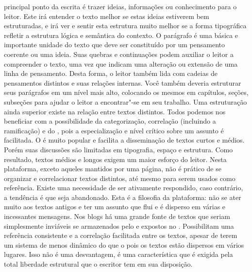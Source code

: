 \markdownRendererInterblockSeparator
{} principal ponto da escrita é trazer ideias, informações ou conhecimento para o leitor. Este irá entender o texto melhor se estas ideias estiverem bem estruturadas, e irá ver e sentir esta estrutura muito melhor se a forma tipográfica refletir a estrutura lógica e semântica do contexto.\markdownRendererInterblockSeparator
{}O parágrafo é uma básica e importante unidade do texto que deve ser constituído por um pensamento coerente ou uma ideia. Suas quebras e continuações podem auxiliar o leitor a compreender o texto, uma vez que indicam uma alteração ou extensão de uma linha de pensamento. Desta forma, o leitor também lida com cadeias de pensamentos distintos e suas relações internas. Você também deveria estruturar seus parágrafos em um nível mais alto, colocando os mesmos em capítulos, seções, subseções\markdownRendererEllipsis{} para ajudar o leitor a encontrar"-se em seu trabalho.\markdownRendererInterblockSeparator
{}Uma estruturação ainda superior existe na relação entre textos distintos. Todos podemos nos beneficiar com a possibilidade da categorização, correlação (incluindo a ramificação) e do , pois a especialização e nível crítico sobre um assunto é facilitada.\fimsubsec\markdownRendererInterblockSeparator
{}\markdownRendererInterblockSeparator
{}O  é muito popular e facilita a disseminação de textos curtos e médios. Porém suas discussões são limitadas em tipografia, espaço e estrutura. Como resultado, textos médios e longos exigem um maior esforço do leitor. Nesta plataforma, exceto aqueles mantidos por uma página, não é prático de se organizar e correlacionar textos distintos, até mesmo para serem usados como referência. Existe uma necessidade de ser ativamente respondido, caso contrário, a tendência é que seja abandonado. Esta é a filosofia da plataforma: não se ater muito aos textos antigos e ter um assunto que flui e é disperso em várias e incessantes mensagens.\markdownRendererInterblockSeparator
{}Nos blogs há uma grande fonte de textos que seriam simplesmente inviáveis se armazenados pelo e expostos no . Possibilitam uma referência consistente e a correlação facilitada entre os textos, apesar de terem um sistema de  menos dinâmico do que o  pois os textos estão dispersos em vários lugares. Isso não é uma desvantagem, é uma característica que é exigida pela total liberdade estrutural que o escritor tem em sua disposição.\markdownRendererInterblockSeparator

